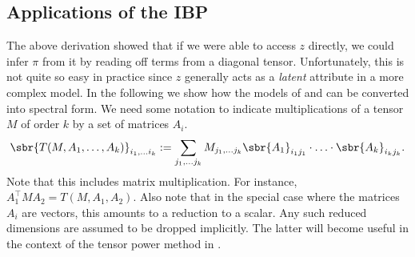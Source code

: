 \documentclass[twoside,11pt]{article}
\newcommand{\symm}{\mathfrak{S}}
\begin{document}


\subsection{Applications of the IBP}

The above derivation showed that if we were able to access $z$ directly, we
could infer $\pi$ from it by reading off terms from a diagonal
tensor. Unfortunately, this is not quite so easy in practice since $z$
generally acts as a \emph{latent} attribute in a more complex
model. In the following we show how the models of  and
 can be converted into spectral form. We need some
notation to indicate multiplications of a tensor $M$ of order $k$ by a set of
matrices $A_i$. 
\begin{align}
  \label{eq:tensor-mat}
  \sbr{T(M, A_1, \ldots, A_k)}_{i_1, \ldots i_k} :=  \sum_{j_1, \ldots
    j_k} M_{j_1, \ldots j_k} \sbr{A_1}_{i_1 j_1} \cdot \ldots \cdot
  \sbr{A_k}_{i_k j_k}.
\end{align}
Note that this includes matrix multiplication. For instance, $A_1^\top
M A_2 = T(M, A_1, A_2)$. Also note that in the special case where the
matrices $A_i$ are vectors, this amounts to a reduction to a
scalar. Any such reduced dimensions are assumed to be dropped
implicitly. The latter will become useful in the context of the tensor
power method in \cite{AnaGeHsuKakTel12}. 
\end{document}

